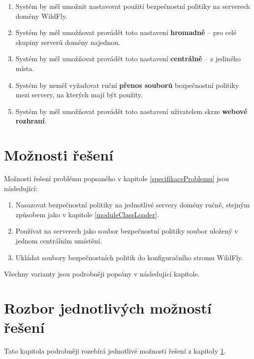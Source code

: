 \begin{enumerate}
  \item Systém by měl umožnit nastavovat použití bezpečnostní politiky na serverech domény WildFly.
  \item Systém by měl umožňovat provádět toto nastavení {\bf hromadně} -- pro celé skupiny serverů domény najednou.
  \item Systém by měl umožňovat provádět toto nastavení {\bf centrálně} -- z jediného místa.
  \item Systém by neměl vyžadovat ruční {\bf přenos souborů} bezpečnostní politiky mezi servery, na kterých mají být použity.
  \item Systém by měl umožňovat provádět toto nastavení uživatelem skrze {\bf webové rozhraní}.
\end{enumerate}

\section{Možnosti řešení} \label{vycetMoznostiReseni}

Možnosti řešení problému popsaného v kapitole \ref{specifikaceProblemu} jsou následující:

\begin{enumerate}
  \item Nasazovat bezpečnostní politiky na jednotlivé servery domény ručně, stejným způsobem jako v kapitole \ref{moduleClassLoader}.
  \item Používat na serverech jako soubor bezpečnostní politiky soubor uložený v jednom centrálním umístění.
  \item Ukládat soubory bezpečnostních politik do konfiguračního stromu WildFly.
\end{enumerate}

Všechny varianty jsou podrobněji popsány v následující kapitole.

\section{Rozbor jednotlivých možností řešení} \label{rozborReseni}

Tato kapitola podrobněji rozebírá jednotlivé možnosti řešení z kapitoly \ref{vycetMoznostiReseni}.

